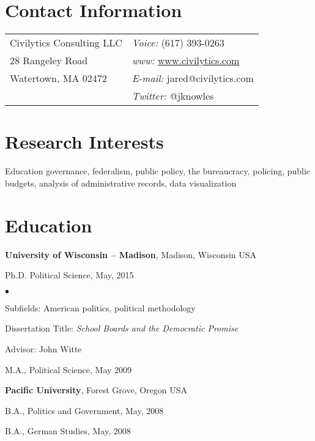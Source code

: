 \documentclass[margin,line]{res}
\newenvironment{list1}{
  \begin{list}{\ding{113}}{%
      \setlength{\itemsep}{0in}
      \setlength{\parsep}{0in} \setlength{\parskip}{0in}
      \setlength{\topsep}{0in} \setlength{\partopsep}{0in} 
      \setlength{\leftmargin}{0.17in}}}{\end{list}}
\newenvironment{list2}{
  \begin{list}{$\bullet$}{%
      \setlength{\itemsep}{0in}
      \setlength{\parsep}{0in} \setlength{\parskip}{0in}
      \setlength{\topsep}{0in} \setlength{\partopsep}{0in} 
      \setlength{\leftmargin}{0.2in}}}{\end{list}}
\begin{document}

\begin{resume}
\section{\sc Contact Information}
\vspace{.05in}
\begin{tabular}{@{}p{2.75in}p{2.75in}}
Civilytics Consulting LLC & {\it Voice:}  (617) 393-0263 \\            
28 Rangeley Road & {\it www:} \url{www.civilytics.com} \\           
Watertown, MA 02472 & {\it E-mail:}  jared@civilytics.com\\       
 & {\it Twitter:} @jknowles      \\   
\end{tabular}


\section{\sc Research Interests}
Education governance, federalism, public policy, the bureaucracy, policing, 
public budgets, analysis of administrative records, data visualization

\section{\sc Education}
{\bf University of Wisconsin -- Madison}, Madison, Wisconsin USA\\
\vspace*{-.1in}
\begin{list1}
\item[] Ph.D. Political Science, May, 2015
\begin{list2}
\vspace*{.05in}
\item Subfields: American politics, political methodology
\item Dissertation Title: \emph {School Boards and the Democratic Promise} 
\item Advisor:  John Witte
\end{list2}
\vspace*{.05in}
\item[] M.A., Political Science,  May 2009
\end{list1}

{\bf Pacific University}, Forest Grove, Oregon USA\\
\vspace*{-.1in}
\begin{list1}
\item[] B.A., Politics and Government,  May, 2008
\item[] B.A., German Studies, May, 2008
\end{list1}



\end{resume}
\end{document}
